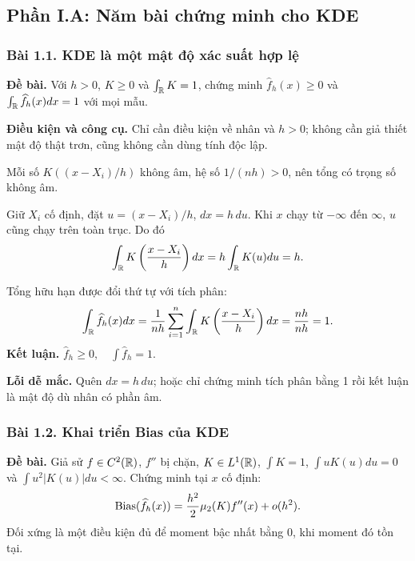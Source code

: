 \clearpage
\label{ot45:start}

\subsection{Phần I.A: Năm bài chứng minh cho KDE}

\subsubsection*{Bài 1.1. KDE là một mật độ xác suất hợp lệ}\label{ot45:kde-density}
\textbf{Đề bài.} Với $h>0$, $K\geq0$ và $\int_{\mathbb R}K=1$, chứng minh
$\widehat f_h(x)\geq0$ và $\int_{\mathbb R}\widehat f_h(x)dx=1$ với mọi mẫu.

\textbf{Điều kiện và công cụ.} Chỉ cần điều kiện về nhân và $h>0$;
không cần giả thiết mật độ thật trơn, cũng không cần dùng tính độc lập.

Mỗi số $K((x-X_i)/h)$ không âm, hệ số $1/(nh)>0$, nên tổng có trọng số không âm.

Giữ $X_i$ cố định, đặt $u=(x-X_i)/h$, $dx=h\,du$.
Khi $x$ chạy từ $-\infty$ đến $\infty$, $u$ cũng chạy trên toàn trục. Do đó
\[
\int_{\mathbb R}K\left(\frac{x-X_i}{h}\right)dx=h\int_{\mathbb R}K(u)du=h.
\]

Tổng hữu hạn được đổi thứ tự với tích phân:
\[
\int_{\mathbb R}\widehat f_h(x)dx
=\frac1{nh}\sum_{i=1}^n\int_{\mathbb R}K\left(\frac{x-X_i}{h}\right)dx
=\frac{nh}{nh}=1.
\]
\textbf{Kết luận.} $\boxed{\widehat f_h\geq0,\quad\int\widehat f_h=1.}$

\textbf{Lỗi dễ mắc.} Quên $dx=h\,du$; hoặc chỉ chứng minh tích phân bằng 1 rồi kết luận là mật độ dù nhân có phần âm.

\subsubsection*{Bài 1.2. Khai triển Bias của KDE}\label{ot45:kde-bias}
\textbf{Đề bài.} Giả sử $f\in C^2(\mathbb R)$, $f''$ bị chặn,
$K\in L^1(\mathbb R)$, $\int K=1$, $\int uK(u)du=0$ và
$\int u^2|K(u)|du<\infty$. Chứng minh tại $x$ cố định:
\[
\operatorname{Bias}(\widehat f_h(x))=\frac{h^2}{2}\mu_2(K)f''(x)+o(h^2).
\]
Đối xứng là một điều kiện đủ để moment bậc nhất bằng 0, khi moment đó tồn tại.

